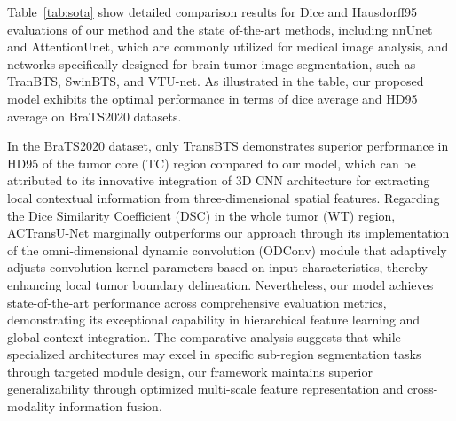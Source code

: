 \documentclass[AMA,Times1COL]{WileyNJDv5} %
\begin{document}
Table~\ref{tab:sota} show detailed comparison results for Dice and Hausdorff95 evaluations of our method and the state of-the-art methods, including nnUnet and AttentionUnet, which are commonly utilized for medical image analysis, and networks specifically designed for brain tumor image segmentation, such as TranBTS, SwinBTS, and VTU-net. As illustrated in the table, our proposed model exhibits the optimal performance in terms of dice average and HD95 average on BraTS2020 datasets.

In the BraTS2020 dataset, only TransBTS demonstrates superior performance in HD95 of the tumor core (TC) region compared to our model, which can be attributed to its innovative integration of 3D CNN architecture for extracting local contextual information from three-dimensional spatial features. Regarding the Dice Similarity Coefficient (DSC) in the whole tumor (WT) region, ACTransU-Net marginally outperforms our approach through its implementation of the omni-dimensional dynamic convolution (ODConv) module that adaptively adjusts convolution kernel parameters based on input characteristics, thereby enhancing local tumor boundary delineation. Nevertheless, our model achieves state-of-the-art performance across comprehensive evaluation metrics, demonstrating its exceptional capability in hierarchical feature learning and global context integration. The comparative analysis suggests that while specialized architectures may excel in specific sub-region segmentation tasks through targeted module design, our framework maintains superior generalizability through optimized multi-scale feature representation and cross-modality information fusion.
\end{document}
